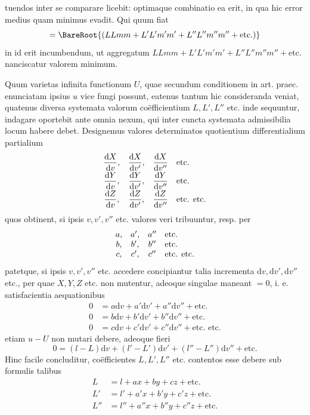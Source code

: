 %
tuendos inter se comparare licebit: optimaque combinatio ea erit, in qua hic error medius quam minimus evadit. Qui quum fiat
\[
=\BareRoot{(LLmm+L'L'm'm'+L''L''m''m''+\text{etc.})}
\]
in id erit incumbendum, ut aggregatum \(LLmm+L'L'm'm'+L''L''m''m''+\text{etc.}\) nanciscatur valorem minimum.

Quum varietas infinita functionum \(U\), quae secundum conditionem in art. praec. enunciatam ipsius \(u\) vice fungi possunt, eatenus tantum hic consideranda veniat, quatenus diversa systemata valorum coëfficientium \(L,L',L''\) etc. inde sequuntur, indagare oportebit ante omnia nexum, qui inter cuncta systemata admissibilia locum habere debet. Designemus valores determinatos quotientium differentialium partialium
\[
\begin{array}{ccc l}
\dfrac{\mathrm dX}{\mathrm dv},&\dfrac{\mathrm dX}{\mathrm dv'},&\dfrac{\mathrm dX}{\mathrm dv''}&\text{etc.}\\[5pt]
\dfrac{\mathrm dY}{\mathrm dv},&\dfrac{\mathrm dY}{\mathrm dv'},&\dfrac{\mathrm dY}{\mathrm dv''}&\text{etc.}\\[5pt]
\dfrac{\mathrm dZ}{\mathrm dv},&\dfrac{\mathrm dZ}{\mathrm dv'},&\dfrac{\mathrm dZ}{\mathrm dv''}&\text{etc. etc.}
\end{array}
\]
quos obtinent, si ipsis \(v,v',v''\) etc. valores veri tribuuntur, resp. per
\[
\begin{array}{ccc l}
a,&a',&a''&\text{etc.}\\
b,&b',&b''&\text{etc.}\\
c,&c',&c''&\text{etc. etc.}
\end{array}
\]
patetque, si ipsis \(v,v',v''\) etc. accedere concipiantur talia incrementa \(\mathrm dv,\mathrm dv',\mathrm dv''\) etc., per quae \(X,Y,Z\) etc. non mutentur, adeoque singulae maneant \(=0\), i. e. satisfacientia aequationibus
\[
\begin{aligned}
0&=a\mathrm dv+a'\mathrm dv'+a''\mathrm dv''+\text{etc.}\\
0&=b\mathrm dv+b'\mathrm dv'+b''\mathrm dv''+\text{etc.}\\
0&=c\mathrm dv+c'\mathrm dv'+c''\mathrm dv''+\text{etc. etc.}
\end{aligned}
\]
etiam \(u-U\) non mutari debere, adeoque fieri
\[
0=(l-L)\mathrm dv+(l'-L')\mathrm dv'+(l''-L'')\mathrm dv''+\text{etc.}
\]
%
Hinc facile concluditur, coëfficientes \(L,L',L''\) etc. contentos esse debere sub formulis talibus
\[
\begin{aligned}
L&=l+ax+by+cz+\text{etc.}\\
L'&=l'+a'x+b'y+c'z+\text{etc.}\\
L''&=l''+a''x+b''y+c''z+\text{etc.}
\end{aligned}
\]
